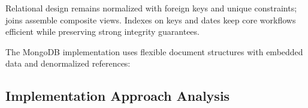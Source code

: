 \documentclass[12pt,a4paper]{article}
\begin{document}
Relational design remains normalized with foreign keys and unique constraints; joins assemble composite views. Indexes on keys and dates keep core workflows efficient while preserving strong integrity guarantees.

The MongoDB implementation uses flexible document structures with embedded data and denormalized references:
\begin{comment}
\begin{lstlisting}[language=Java, caption=MongoDB Document Structures]
// Student document - self-contained with all attributes
{
  "student_id": 1,
  "name": "John Smith",
  "email": "john.smith@university.edu",
  "phone": "+44 20 7946 0958",
  "address": "123 University Street, London, UK",
  "registration_date": "2023-09-15"
}

// Book document with inventory tracking
{
  "book_id": 1,
  "title": "Introduction to Database Systems",
  "author": "C.J. Date",
  "isbn": "978-0321197849",
  "category": "Computer Science",
  "publication_year": 2019,
  "available_copies": 3,
  "total_copies": 5
}

// Loan document with denormalized references (no foreign key enforcement)
{
  "loan_id": 1,
  "student_id": 1,
  "book_id": 1,
  "loan_date": "2024-01-15",
  "due_date": "2024-01-29",
  "return_date": null,
  "status": "ACTIVE",
  "renewal_count": 0
}
\end{lstlisting}
\end{comment}

\subsection{Implementation Approach Analysis}
\end{document}
